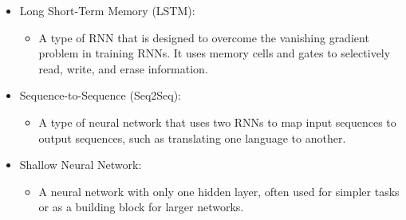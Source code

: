 \begin{itemize}
        \item Long Short-Term Memory (LSTM): 
            \begin{itemize}
                \item A type of RNN that is designed to overcome the vanishing gradient problem in training RNNs. It uses memory cells and gates to selectively read, write, and erase information.
            \end{itemize}
        \item Sequence-to-Sequence (Seq2Seq): 
            \begin{itemize}
                \item A type of neural network that uses two RNNs to map input sequences to output sequences, such as translating one language to another.
            \end{itemize}
        \item Shallow Neural Network: 
            \begin{itemize}
                \item A neural network with only one hidden layer, often used for simpler tasks or as a building block for larger networks.
            \end{itemize}
    \end{itemize}